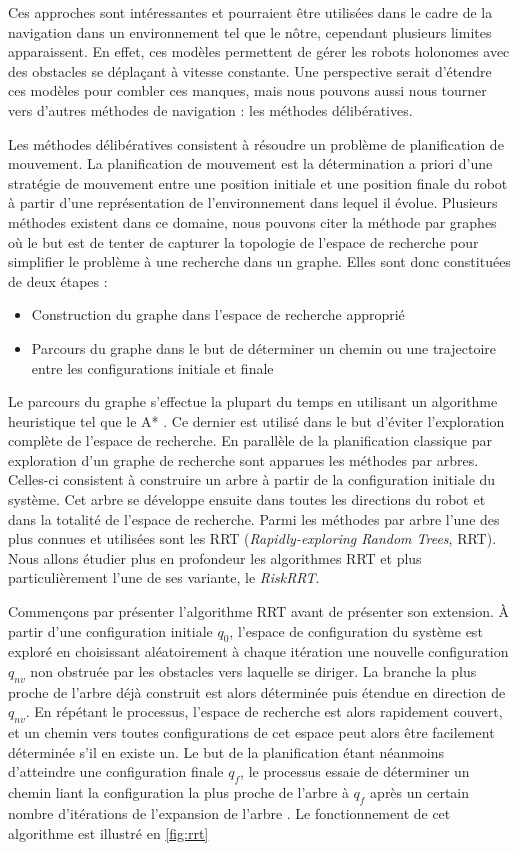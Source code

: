 Ces approches sont intéressantes et pourraient être utilisées dans le cadre de la navigation dans un environnement tel que le nôtre, cependant plusieurs limites apparaissent. En effet, ces modèles permettent de gérer les robots holonomes avec des obstacles se déplaçant à vitesse constante. Une perspective serait d'étendre ces modèles pour combler ces manques, mais nous pouvons aussi nous tourner vers d'autres méthodes de navigation : les méthodes délibératives.

Les méthodes délibératives consistent à résoudre un problème de planification de mouvement. La planification de mouvement est la détermination a priori d'une stratégie de mouvement entre une position initiale et une position finale du robot à partir d'une représentation de l'environnement dans lequel il évolue. Plusieurs méthodes existent dans ce domaine, nous pouvons citer la méthode par graphes où le but est de tenter de capturer la topologie de l'espace de recherche pour simplifier le problème à une recherche dans un graphe. Elles sont donc constituées de deux étapes : 
\begin{itemize}
    \item Construction du graphe dans l'espace de recherche approprié
    \item Parcours du graphe dans le but de déterminer un chemin ou une trajectoire entre les configurations initiale et finale
\end{itemize}
Le parcours du graphe s'effectue la plupart du temps en utilisant un algorithme heuristique tel que le A* \cite{hart_formal_1968}. Ce dernier est utilisé dans le but d'éviter l'exploration complète de l'espace de recherche. En parallèle de la planification classique par exploration d'un graphe de recherche sont apparues les méthodes par arbres. Celles-ci consistent à construire un arbre à partir de la configuration initiale du système. Cet arbre se développe ensuite dans toutes les directions du robot et dans la totalité de l'espace de recherche. Parmi les méthodes par arbre l'une des plus connues et utilisées sont les RRT (\textit{Rapidly-exploring Random Trees}, RRT). Nous allons étudier plus en profondeur les algorithmes RRT et plus particulièrement l'une de ses variante, le \textit{RiskRRT}.

Commençons par présenter l'algorithme RRT avant de présenter son extension. À partir d'une configuration initiale $q_0$, l'espace de configuration du système est exploré en choisissant aléatoirement à chaque itération une nouvelle configuration $q_{nv}$ non obstruée par les obstacles vers laquelle se diriger. La branche la plus proche de l'arbre déjà construit est alors déterminée puis étendue en direction de $q_{nv}$. En répétant le processus, l'espace de recherche est alors rapidement couvert, et un chemin vers toutes configurations de cet espace peut alors être facilement déterminée s'il en existe un. Le but de la planification étant néanmoins d'atteindre une configuration finale $q_f$, le processus essaie de déterminer un chemin liant la configuration la plus proche de l'arbre à $q_f$ après un certain nombre d'itérations de l'expansion de l'arbre \cite{delsart_navigation_2011}. Le fonctionnement de cet algorithme est illustré en \autoref{fig:rrt}

